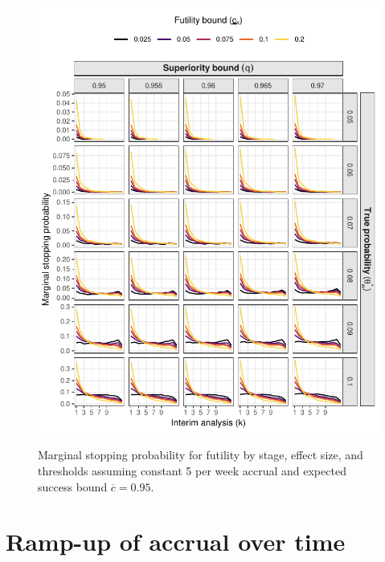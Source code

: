 \documentclass{article}
\begin{document}
\begin{figure}[!ht]
	\caption{Marginal stopping probability for futility by stage, effect size, and thresholds assuming constant 5 per week accrual and expected success bound $\overline{c}=0.95$.}
	\includegraphics{figures/stop_futility_5.pdf}
	\label{fig:stop_futility_5}
\end{figure}

\clearpage

\section{Ramp-up of accrual over time}
\end{document}
